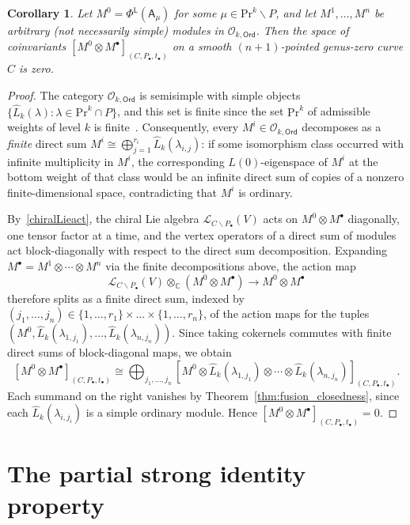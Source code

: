 \documentclass[12pt,a4paper,reqno]{amsart}
\numberwithin{equation}{section}
\newtheorem{corollary}[theorem]{Corollary}
\theoremstyle{definition}
\newcommand{\C}{\mathbb{C}}
\def\O{\mathcal{O}}
\def\Ord{\mathsf{Ord}}
\def\L{\mathsf{L}}
\def\Pr{\mathrm{Pr}}
\def\la{\lambda}
\def\bs{\backslash}
\def\o{\otimes}
\def\ds{\dots}
\def\A{\mathsf{A}}
\begin{document}
\begin{corollary}\label{coro:fusion_closedness_general}
Let $M^0=\Phi^\L(\A_\mu)$ for some $\mu\in \Pr^k\bs P$, and let $M^1,\ds,M^n$ be arbitrary (not necessarily simple) modules in $\O_{k,\Ord}$. Then the space of coinvariants $[M^0\o M^\bullet]_{(C,P_\bullet,t_\bullet)}$ on a smooth $(n+1)$-pointed genus-zero curve $C$ is zero.
\end{corollary}
\begin{proof}
The category $\O_{k,\Ord}$ is semisimple with simple objects $\{\hat{L}_k(\la):\la\in \Pr^k\cap P\}$, and this set is finite since the set $\Pr^k$ of admissible weights of level $k$ is finite~\cite[Theorems 2.1 and 2.2]{kac1989classification}. Consequently, every $M^i\in \O_{k,\Ord}$ decomposes as a \emph{finite} direct sum $M^i\cong \bigoplus_{j=1}^{r_i} \hat{L}_k(\la_{i,j})$: if some isomorphism class occurred with infinite multiplicity in $M^i$, the corresponding $L(0)$-eigenspace of $M^i$ at the bottom weight of that class would be an infinite direct sum of copies of a nonzero finite-dimensional space, contradicting that $M^i$ is ordinary.

By~\eqref{chiralLieact}, the chiral Lie algebra $\mathcal{L}_{C\bs P_\bullet}(V)$ acts on $M^0\o M^\bullet$ diagonally, one tensor factor at a time, and the vertex operators of a direct sum of modules act block-diagonally with respect to the direct sum decomposition. Expanding $M^\bullet=M^1\o\cdots\o M^n$ via the finite decompositions above, the action map
\[
\mathcal{L}_{C\bs P_\bullet}(V)\o_{\C} (M^0\o M^\bullet) \longrightarrow M^0\o M^\bullet
\]
therefore splits as a finite direct sum, indexed by $(j_1,\ds,j_n)\in \{1,\ds,r_1\}\times\ds\times\{1,\ds,r_n\}$, of the action maps for the tuples $(M^0,\hat{L}_k(\la_{1,j_1}),\ds,\hat{L}_k(\la_{n,j_n}))$. Since taking cokernels commutes with finite direct sums of block-diagonal maps, we obtain
\[
[M^0\o M^\bullet]_{(C,P_\bullet,t_\bullet)}\cong \bigoplus_{j_1,\ds,j_n} [M^0\o \hat{L}_k(\la_{1,j_1})\o\cdots\o \hat{L}_k(\la_{n,j_n})]_{(C,P_\bullet,t_\bullet)}.
\]
Each summand on the right vanishes by Theorem~\ref{thm:fusion_closedness}, since each $\hat{L}_k(\la_{i,j_i})$ is a simple ordinary module. Hence $[M^0\o M^\bullet]_{(C,P_\bullet,t_\bullet)}=0$.
\end{proof}









\section{The partial strong identity property}\label{sec:strong_identity}
\end{document}
